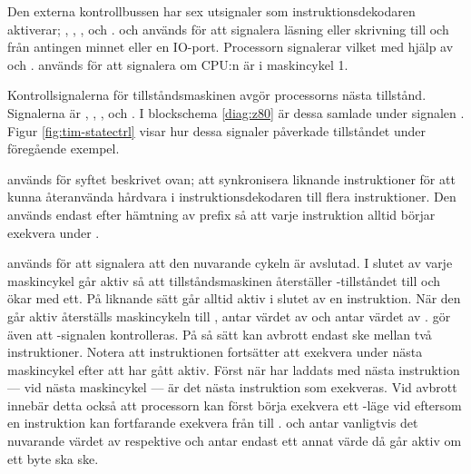 \documentclass[main.tex]{subfiles}
\begin{document}
Den externa kontrollbussen har sex utsignaler som instruktionsdekodaren
aktiverar; , , ,  och .
 och  används för att signalera läsning eller skrivning till
och från antingen minnet eller en IO-port. Processorn signalerar vilket med
hjälp av  och .  används för att signalera om
CPU:n är i maskincykel 1.

Kontrollsignalerna för tillståndsmaskinen avgör processorns nästa tillstånd.
Signalerna är , , ,
 och . I blockschema \ref{diag:z80} är dessa
samlade under signalen . Figur \ref{fig:tim-statectrl} visar hur
dessa signaler påverkade tillståndet under föregående exempel.

\begin{SCfigure}
    \centering
    
    \caption{Programmet från figur \ref{fig:tim-states} med kontrollsignalerna
    för tillstånden synliga.}
    \label{fig:tim-statectrl}
\end{SCfigure}

 används för syftet beskrivet ovan; att synkronisera liknande
instruktioner för att kunna återanvända hårdvara i instruktionsdekodaren till
flera instruktioner. Den används endast efter hämtning av prefix så att varje
instruktion alltid börjar exekvera under .

 används för att signalera att den nuvarande cykeln är
avslutad. I slutet av varje maskincykel går  aktiv så att
tillståndsmaskinen återställer -tillståndet till  och ökar
 med ett. På liknande sätt går  alltid aktiv i slutet
av en instruktion. När den går aktiv återställs maskincykeln till ,
 antar värdet av  och  antar värdet av
.  gör även att -signalen
kontrolleras. På så sätt kan avbrott endast ske mellan två instruktioner.
Notera att instruktionen fortsätter att exekvera under nästa maskincykel efter
att  har gått aktiv. Först när  har laddats med nästa
instruktion --- vid  nästa maskincykel --- är det nästa instruktion
som exekveras. Vid avbrott innebär detta också att processorn kan först börja
exekvera ett -läge vid  eftersom en instruktion kan
fortfarande exekvera från  till .  och
 antar vanligtvis det nuvarande värdet av  respektive
 och antar endast ett annat värde då  går aktiv om
ett byte ska ske.
\end{document}
